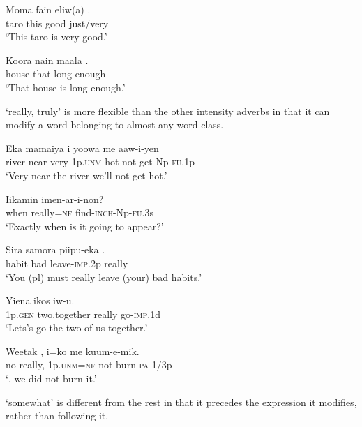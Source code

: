 \ea%
\label{ex:x508}
\gll Moma fain eliw(a) . \\
taro this good just/very \\
\glt`This taro is very good.'
\z

\ea%
\label{ex:x510}
\gll Koora nain maala . \\
house that long enough\\
\glt`That house is long enough.'
\z

 `really, truly' is more flexible than the other intensity adverbs in that it can modify a word belonging to almost any word class.

\ea%
\label{ex:x706}
\gll Eka mamaiya  i yoowa me aaw-i-yen \\
river near very 1p.\textsc{unm} hot not get-Np-\textsc{fu}.1p\\
\glt`Very near the river we'll not get hot.'
\z

\ea%
\label{ex:x708}
\gll Iikamin  imen-ar-i-non? \\
when really=\textsc{nf} find-\textsc{inch}-Np-\textsc{fu}.3s\\
\glt`Exactly when is it going to appear?'
\z

\ea%
\label{ex:x709}
\gll Sira samora piipu-eka . \\
habit bad leave-\textsc{imp}.2p really\\
\glt`You (pl) must really leave (your) bad habits.'
\z

\ea%
\label{ex:x710}
\gll Yiena ikos  iw-u. \\
1p.\textsc{gen} two.together really go-\textsc{imp}.1d\\
\glt`Lets's go  the two of us together.'
\z

\ea%
\label{ex:x1875}
\gll Weetak , i=ko me kuum-e-mik. \\
no really, 1p.\textsc{unm}=\textsc{nf} not burn-\textsc{pa}-1/3p\\
\glt`, we did not burn it.'
\z

 `somewhat' is different from the rest in that it precedes the expression it modifies, rather than following it.

